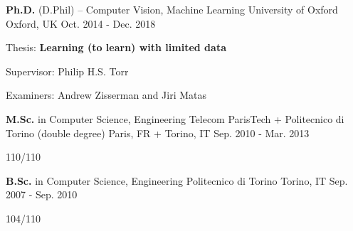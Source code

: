 

\begin{cventries}

  \cventry
    {\textbf{Ph.D.} (D.Phil) -- Computer Vision, Machine Learning} %
    {University of Oxford} %
    {Oxford, UK} %
    {Oct. 2014 - Dec. 2018} %
    {
      \begin{cvitems} %
	  \item {Thesis: \textbf{Learning (to learn) with limited data}}
          \item{Supervisor: Philip H.S. Torr}	  
	  \item {Examiners: Andrew Zisserman and Jiri Matas}
      \end{cvitems}
    }

  \cventry
    {\textbf{M.Sc.} in Computer Science, Engineering} %
    {Telecom ParisTech + Politecnico di Torino (double degree)} %
    {Paris, FR + Torino, IT} %
    {Sep. 2010 - Mar. 2013} %
    {
      \begin{cvitems} %
        \item {110/110}
      \end{cvitems}
    }

  \cventry
    {\textbf{B.Sc.} in Computer Science, Engineering} %
    {Politecnico di Torino} %
    {Torino, IT} %
    {Sep. 2007 - Sep. 2010} %
    {
      \begin{cvitems} %
        \item {104/110}
      \end{cvitems}
    }  
\end{cventries}
